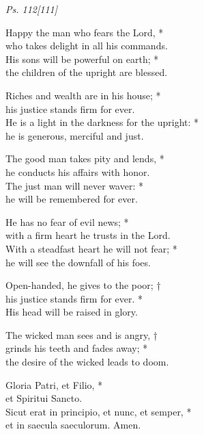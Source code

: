 \emph{\small Ps. 112[111]}

Happy the man who fears the Lord, *\\
who takes delight in all his commands.\\
His sons will be powerful on earth; *\\
the children of the upright are blessed.

Riches and wealth are in his house; *\\
his justice stands firm for ever.\\
He is a light in the darkness for the upright: *\\
he is generous, merciful and just.

The good man takes pity and lends, *\\
he conducts his affairs with honor.\\
The just man will never waver: *\\
he will be remembered for ever.

He has no fear of evil news; *\\
with a firm heart he trusts in the Lord.\\
With a steadfast heart he will not fear; *\\
he will see the downfall of his foes.

Open-handed, he gives to the poor; †\\
his justice stands firm for ever. *\\
His head will be raised in glory.

The wicked man sees and is angry, †\\
grinds his teeth and fades away; *\\
the desire of the wicked leads to doom.

Gloria Patri, et Filio, *\\
et Spiritui Sancto. \\
Sicut erat in principio, et nunc, et semper, *\\
et in saecula saeculorum. Amen.\\    
